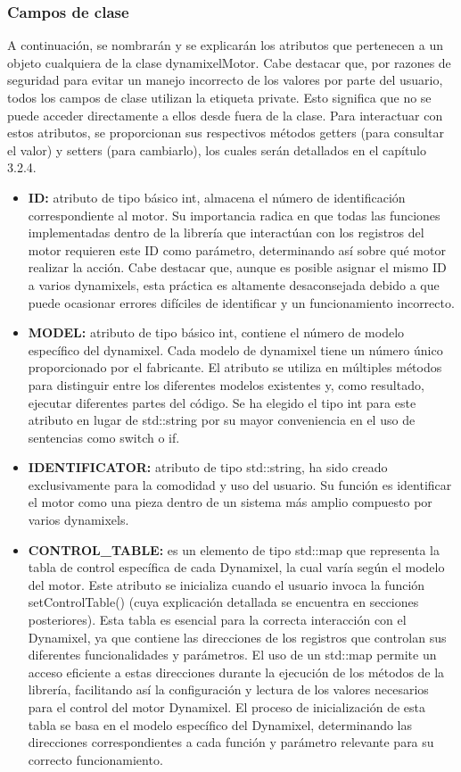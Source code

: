 \documentclass{article}
\begin{document}
\subsubsection{Campos de clase}
A continuación, se nombrarán y se explicarán los atributos que pertenecen a un objeto cualquiera de la clase dynamixelMotor. Cabe destacar que, por razones de seguridad para evitar un manejo incorrecto de los valores por parte del usuario, todos los campos de clase utilizan la etiqueta private. Esto significa que no se puede acceder directamente a ellos desde fuera de la clase. Para interactuar con estos atributos, se proporcionan sus respectivos métodos getters (para consultar el valor) y setters (para cambiarlo), los cuales serán detallados en el capítulo 3.2.4.
\begin{itemize}
    \item \textbf{ID:} atributo de tipo básico int, almacena el número de identificación correspondiente al motor. Su importancia radica en que todas las funciones implementadas dentro de la librería que interactúan con los registros del motor requieren este ID como parámetro, determinando así sobre qué motor realizar la acción. Cabe destacar que, aunque es posible asignar el mismo ID a varios dynamixels, esta práctica es altamente desaconsejada debido a que puede ocasionar errores difíciles de identificar y un funcionamiento incorrecto.
    
    \item \textbf{MODEL:} atributo de tipo básico int, contiene el número de modelo específico del dynamixel. Cada modelo de dynamixel tiene un número único proporcionado por el fabricante. El atributo se utiliza en múltiples métodos para distinguir entre los diferentes modelos existentes y, como resultado, ejecutar diferentes partes del código. Se ha elegido el tipo int para este atributo en lugar de std::string por su mayor conveniencia en el uso de sentencias como switch o if.
    
    \item \textbf{IDENTIFICATOR:} atributo de tipo std::string, ha sido creado exclusivamente para la comodidad y uso del usuario. Su función es identificar el motor como una pieza dentro de un sistema más amplio compuesto por varios dynamixels.

    \item \textbf{CONTROL\_TABLE:} es un elemento de tipo std::map que representa la tabla de control específica de cada Dynamixel, la cual varía según el modelo del motor. Este atributo se inicializa cuando el usuario invoca la función setControlTable() (cuya explicación detallada se encuentra en secciones posteriores). Esta tabla es esencial para la correcta interacción con el Dynamixel, ya que contiene las direcciones de los registros que controlan sus diferentes funcionalidades y parámetros. El uso de un std::map permite un acceso eficiente a estas direcciones durante la ejecución de los métodos de la librería, facilitando así la configuración y lectura de los valores necesarios para el control del motor Dynamixel. El proceso de inicialización de esta tabla se basa en el modelo específico del Dynamixel, determinando las direcciones correspondientes a cada función y parámetro relevante para su correcto funcionamiento.
\end{itemize}
\end{document}

